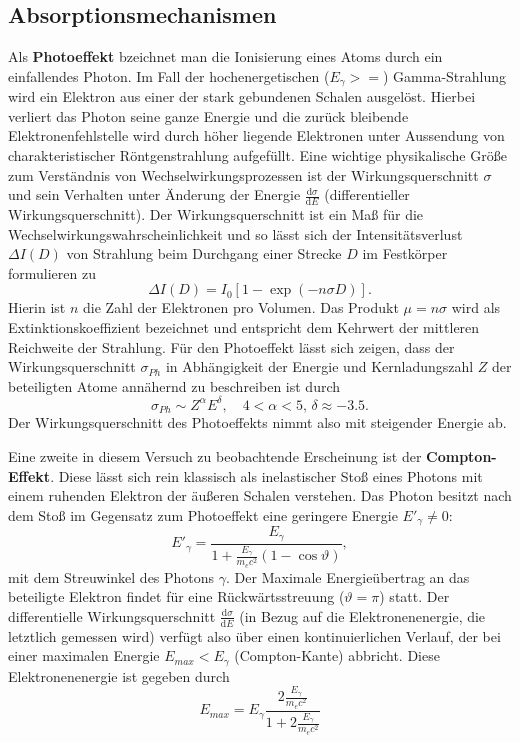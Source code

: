 \subsection{Absorptionsmechanismen}
Als \textbf{Photoeffekt} bzeichnet man die Ionisierung eines Atoms durch ein einfallendes Photon. Im Fall der 
hochenergetischen ($E_\gamma >= $) Gamma-Strahlung wird ein Elektron aus einer der stark gebundenen Schalen 
ausgelöst. Hierbei verliert das Photon seine ganze Energie und die zurück bleibende Elektronenfehlstelle wird durch 
höher liegende Elektronen unter Aussendung von charakteristischer Röntgenstrahlung aufgefüllt. Eine wichtige physikalische 
Größe zum Verständnis von Wechselwirkungsprozessen ist der Wirkungsquerschnitt $\sigma$ und sein Verhalten unter 
Änderung der Energie $\frac{\mathup{d}\sigma}{\mathup{d}E}$ (differentieller Wirkungsquerschnitt). Der Wirkungsquerschnitt 
ist ein Maß für die Wechselwirkungswahrscheinlichkeit und so lässt sich der Intensitätsverlust $\Delta I(D)$ von Strahlung beim Durchgang einer 
Strecke $D$ im Festkörper formulieren zu 
\begin{equation}
    \Delta I(D) = I_0 \left[1 -  \exp\left(- n \sigma D\right)\right].
\end{equation}
Hierin ist $n$ die Zahl der Elektronen pro Volumen. Das Produkt $\mu = n \sigma$ wird als Extinktionskoeffizient 
bezeichnet und entspricht dem Kehrwert der mittleren Reichweite der Strahlung.
Für den Photoeffekt lässt sich zeigen, dass der Wirkungsquerschnitt $\sigma_{Ph}$ in Abhängigkeit der Energie und 
Kernladungszahl $Z$ der beteiligten Atome annähernd zu beschreiben ist durch 
\begin{equation}
    \sigma_{Ph} \sim Z^{\alpha} E^{\delta}, \quad 4 < \alpha < 5, \, \delta \approx -\num{3.5}.
\end{equation}
Der Wirkungsquerschnitt des Photoeffekts nimmt also mit steigender Energie ab. 

Eine zweite in diesem Versuch zu beobachtende Erscheinung ist der \textbf{Compton-Effekt}. Diese lässt sich rein 
klassisch als inelastischer Stoß eines Photons mit einem ruhenden Elektron der äußeren Schalen verstehen. Das Photon besitzt nach 
dem Stoß im Gegensatz zum Photoeffekt eine geringere Energie $E'_\gamma \neq 0$: 
\begin{equation}
    {E'}_{\!\gamma} = \frac{E_\gamma}{1 + \frac{E_\gamma}{m_e c^2} \left(1 - \cos\vartheta \right)},
\end{equation}
mit dem Streuwinkel des Photons $\gamma$. Der Maximale Energieübertrag an das beteiligte Elektron findet für eine 
Rückwärtsstreuung ($\vartheta = \pi$) statt. Der differentielle Wirkungsquerschnitt $\frac{\mathup{d}\sigma}{\mathup{d}E}$
(in Bezug auf die Elektronenenergie, die letztlich gemessen wird) verfügt also über einen kontinuierlichen Verlauf, der 
bei einer maximalen Energie $E_{max} < E_\gamma$ (Compton-Kante) abbricht. Diese Elektronenenergie ist gegeben durch
\begin{equation}
    E_{max} = E_\gamma \frac{2\frac{E_\gamma}{m_ec^2}}{1 + 2\frac{E_\gamma}{m_ec^2}}
    \label{eq: comptonkante_energie}
\end{equation}

